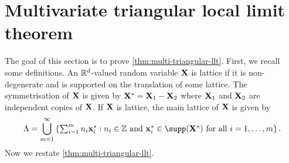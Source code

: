 \section{Multivariate triangular local limit theorem}
\label{sec:llt}

The goal of this section is to prove \cref{thm:multi-triangular-llt}. First, we recall some definitions. An ${\mathbb R}^d$-valued random variable ${\mathbf X}$ is lattice if it is non-degenerate and is supported on the translation of some lattice. The symmetrisation of ${\mathbf X}$ is given by ${\mathbf X}^* = {\mathbf X}_1 - {\mathbf X}_2$ where ${\mathbf X}_1$ and ${\mathbf X}_2$ are independent copies of ${\mathbf X}$. If ${\mathbf X}$ is lattice, the main lattice of ${\mathbf X}$ is given by
\begin{equation*}
    \lattice = \bigcup_{m=1}^{\infty} \left\{ 
        \textstyle \sum_{i=1}^m n_i \vx^*_i : \text{$n_i \in \Z$ and $\vx^*_i \in \supp(\vX^*)$ for all $i = 1, \ldots, m$}
    \right\}.
\end{equation*}
Now we restate \cref{thm:multi-triangular-llt}.
\llt*

